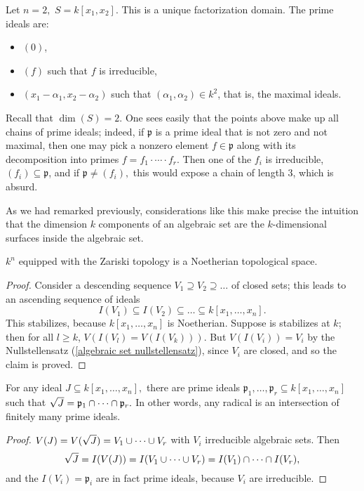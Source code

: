 \begin{example}
  Let \(n=2,\) \(S = k[x_1, x_2].\)
  This is a unique factorization domain. The prime ideals are:
  \begin{itemize}
  \item \((0)\),
  \item \((f)\) such that \(f\) is irreducible,
  \item \((x_1 - \alpha_1, x_2 - \alpha_2)\) such that \((\alpha_1, \alpha_2) \in k^2\), that is, the maximal ideals.
  \end{itemize}
  Recall that \(\dim(S) = 2.\) One sees easily that the points above make up all chains of prime ideals; indeed, if \(\mathfrak p\) is a prime ideal that is not zero and not maximal, then one may pick a nonzero element \(f \in \mathfrak p\) along with its decomposition into primes \(f = f_1 \cdot \dotsm \cdot f_r\). Then one of the \(f_i\) is irreducible, \((f_i) \subseteq \mathfrak p\), and if \(\mathfrak p \neq (f_i),\) this would expose a chain of length \(3\), which is absurd.

  As we had remarked previously, considerations like this make precise the intuition that the dimension \(k\) components of an algebraic set are the \(k\)-dimensional surfaces inside the algebraic set.
\end{example}

\begin{lemma}
  \(k^n\) equipped with the Zariski topology is a Noetherian topological space.
\end{lemma}
\begin{proof}
  Consider a descending sequence \(V_1 \supseteq V_2 \supseteq \dotso\) of closed sets; this leads to an ascending sequence of ideals
  \[I(V_1) \subseteq I(V_2) \subseteq \dotso \subseteq k[x_1, \dotsc, x_n].\]
  This stabilizes, because \(k[x_1, \dotsc, x_n]\) is Noetherian. Suppose is stabilizes at \(k\); then for all \(l \geq k\),
  \(V(I(V_l) = V(I(V_k))).\)
  But \(V(I(V_i)) = V_i\) by the Nullstellensatz (\cref{algebraic set nullstellensatz}), since \(V_i\) are closed,
  and so the claim is proved.
\end{proof}

\begin{corollary}
  For any ideal \(J \subseteq k[x_1, \dotsc, x_n],\) there are prime ideals
  \(\mathfrak p_1, \dotsc, \mathfrak p_r \subseteq k[x_1, \dotsc, x_n]\)
  such that
  \(\sqrt{J} = \mathfrak p_1 \cap \dotsb \cap \mathfrak p_r.\)
  In other words, any radical is an intersection of finitely many prime ideals.
\end{corollary}
\begin{proof}
  \(V(J) = V(\sqrt{J}) = V_1 \cup \dotsb \cup V_r\) with \(V_i\) irreducible algebraic sets. Then
  \[\sqrt{J} = I(V(J)) = I(V_1 \cup \dotsb \cup V_r) = I(V_1) \cap \dotsb \cap I(V_r),\]
  and the \(I(V_i) = \mathfrak p_i\) are in fact prime ideals, because \(V_i\) are irreducible.
\end{proof}






